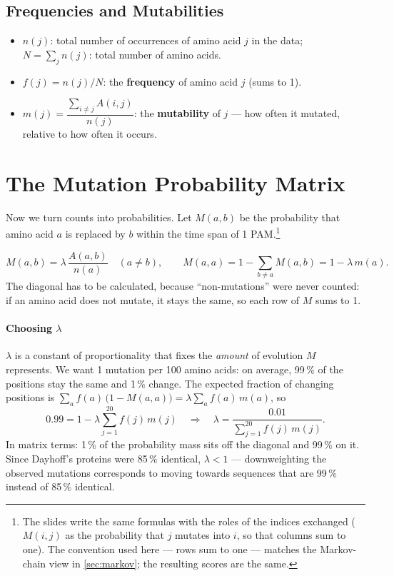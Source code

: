 \documentclass[11pt, oneside]{book}
\let\originalsection\section
\renewcommand{\section}{\Needspace{7\baselineskip}\originalsection}
\let\originalsubsection\subsection
\renewcommand{\subsection}{\Needspace{6\baselineskip}\originalsubsection}
\begin{document}
\subsection{Frequencies and Mutabilities}

\begin{defbox}[title={Quantities from the counts}]
\begin{itemize}
  \item $n(j)$: total number of occurrences of amino acid $j$ in the data;
    $N = \sum_j n(j)$: total number of amino acids.
  \item $f(j) = n(j)/N$: the \textbf{frequency} of amino acid $j$ (sums to 1).
  \item $m(j) = \dfrac{\sum_{i \ne j} A(i,j)}{n(j)}$: the \textbf{mutability}
    of $j$ --- how often it mutated, relative to how often it occurs.
\end{itemize}
\end{defbox}

\section{The Mutation Probability Matrix}

Now we turn counts into probabilities. Let $M(a,b)$ be the probability that
amino acid $a$ is replaced by $b$ within the time span of 1 PAM.\footnote{The
slides write the same formulas with the roles of the indices exchanged
($M(i,j)$ as the probability that $j$ mutates into $i$, so that columns sum
to one). The convention used here --- rows sum to one --- matches the
Markov-chain view in \cref{sec:markov}; the resulting scores are the same.}

\begin{thmbox}[title={Mutation matrix $M$}]
\[
  M(a,b) = \lambda\,\frac{A(a,b)}{n(a)} \quad (a \ne b),
  \qquad
  M(a,a) = 1 - \sum_{b \ne a} M(a,b) = 1 - \lambda\, m(a).
\]
The diagonal has to be calculated, because ``non-mutations'' were never
counted: if an amino acid does not mutate, it stays the same, so each row of
$M$ sums to 1.
\end{thmbox}

\paragraph{Choosing $\lambda$}
$\lambda$ is a constant of proportionality that fixes the \emph{amount} of
evolution $M$ represents. We want 1 mutation per 100 amino acids: on average,
99\,\% of the positions stay the same and 1\,\% change. The expected fraction of
changing positions is $\sum_a f(a)\,\bigl(1 - M(a,a)\bigr) = \lambda \sum_a f(a)\,m(a)$,
so
\[
  0.99 = 1 - \lambda \sum_{j=1}^{20} f(j)\,m(j)
  \quad\Longrightarrow\quad
  \lambda = \frac{0.01}{\sum_{j=1}^{20} f(j)\,m(j)} .
\]
In matrix terms: 1\,\% of the probability mass sits off the diagonal and
99\,\% on it. Since Dayhoff's proteins were 85\,\% identical, $\lambda < 1$ ---
downweighting the observed mutations corresponds to moving towards sequences
that are 99\,\% instead of 85\,\% identical.
\end{document}
